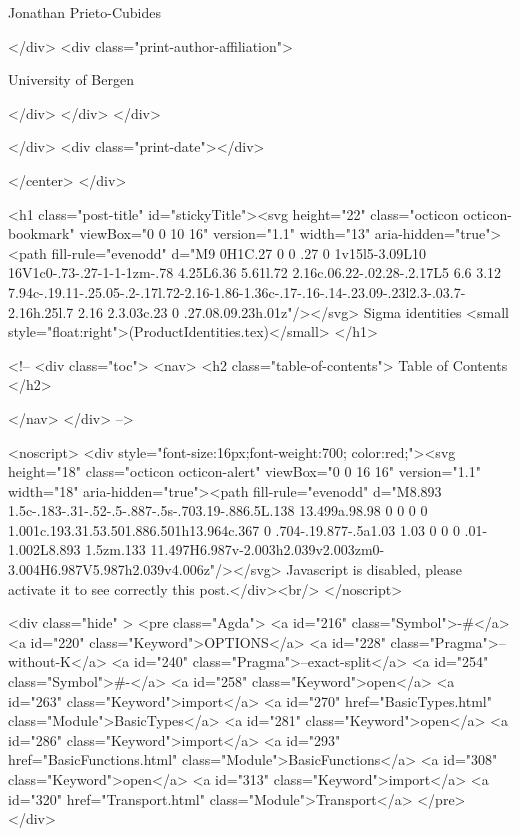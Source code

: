                   Jonathan Prieto-Cubides
                
              </div>
              <div class="print-author-affiliation">
                
                  University of Bergen
                
                </div>
            </div>
          </div>
          
          
        </div>
        <div class="print-date"></div>
        
        
    </center>
  </div>

  

  <h1 class="post-title" id="stickyTitle"><svg height="22" class="octicon octicon-bookmark" viewBox="0 0 10 16" version="1.1" width="13" aria-hidden="true"><path fill-rule="evenodd" d="M9 0H1C.27 0 0 .27 0 1v15l5-3.09L10 16V1c0-.73-.27-1-1-1zm-.78 4.25L6.36 5.61l.72 2.16c.06.22-.02.28-.2.17L5 6.6 3.12 7.94c-.19.11-.25.05-.2-.17l.72-2.16-1.86-1.36c-.17-.16-.14-.23.09-.23l2.3-.03.7-2.16h.25l.7 2.16 2.3.03c.23 0 .27.08.09.23h.01z"/></svg> Sigma identities <small style="float:right">(ProductIdentities.tex)</small>
  </h1>

  <!-- 
  <div class="toc">
    <nav>
    <h2 class="table-of-contents"> Table of Contents </h2>
      

    </nav>
  </div>
   -->

  <noscript>
  <div style="font-size:16px;font-weight:700; color:red;"><svg height="18" class="octicon octicon-alert" viewBox="0 0 16 16" version="1.1" width="18" aria-hidden="true"><path fill-rule="evenodd" d="M8.893 1.5c-.183-.31-.52-.5-.887-.5s-.703.19-.886.5L.138 13.499a.98.98 0 0 0 0 1.001c.193.31.53.501.886.501h13.964c.367 0 .704-.19.877-.5a1.03 1.03 0 0 0 .01-1.002L8.893 1.5zm.133 11.497H6.987v-2.003h2.039v2.003zm0-3.004H6.987V5.987h2.039v4.006z"/></svg> Javascript is disabled, please activate it to see correctly this post.</div><br/>
  </noscript>

  <div class="hide" >
<pre class="Agda">
<a id="216" class="Symbol">{-#</a> <a id="220" class="Keyword">OPTIONS</a> <a id="228" class="Pragma">--without-K</a> <a id="240" class="Pragma">--exact-split</a> <a id="254" class="Symbol">#-}</a>
<a id="258" class="Keyword">open</a> <a id="263" class="Keyword">import</a> <a id="270" href="BasicTypes.html" class="Module">BasicTypes</a>
<a id="281" class="Keyword">open</a> <a id="286" class="Keyword">import</a> <a id="293" href="BasicFunctions.html" class="Module">BasicFunctions</a>
<a id="308" class="Keyword">open</a> <a id="313" class="Keyword">import</a> <a id="320" href="Transport.html" class="Module">Transport</a>
</pre>
</div>

